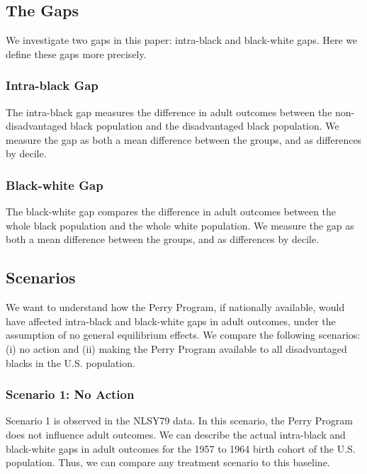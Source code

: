 \subsection{The Gaps}
We investigate two gaps in this paper: intra-black and black-white gaps. Here we define these gaps more precisely.

\subsubsection*{Intra-black Gap}
The intra-black gap measures the difference in adult outcomes between the non-disadvantaged black population and the disadvantaged black population. We measure the gap as both a mean difference between the groups, and as differences by decile.

\subsubsection*{Black-white Gap}
The black-white gap compares the difference in adult outcomes between the whole black population and the whole white population.  We measure the gap as both a mean difference between the groups, and as differences by decile.

\subsection{Scenarios}
We want to understand how the Perry Program, if nationally available, would have affected intra-black and black-white gaps in adult outcomes, under the assumption of no general equilibrium effects. We compare the following scenarios: (i) no action and (ii) making the Perry Program available to all disadvantaged blacks in the U.S. population. 

\subsubsection*{Scenario 1: No Action}
Scenario 1 is observed in the NLSY79 data. In this scenario, the Perry Program does not influence adult outcomes. We can describe the actual intra-black and black-white gaps in adult outcomes for the 1957 to 1964 birth cohort of the U.S. population. Thus, we can compare any treatment scenario to this baseline.

